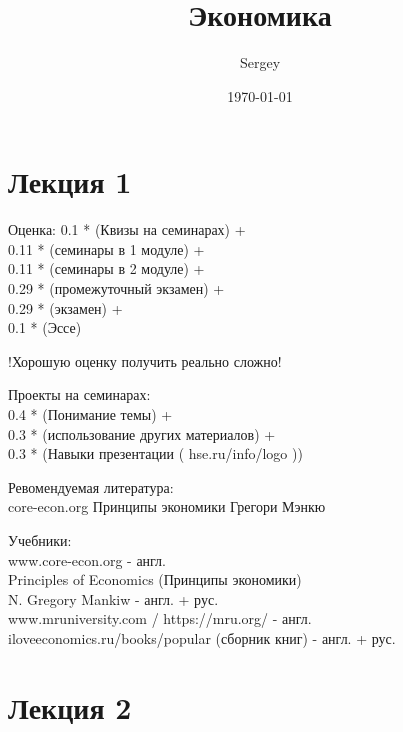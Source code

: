 \documentclass[a4paper]{article}
\author{Sergey}
\title{Экономика}
\date{\today}
\begin{document}
\maketitle

\newpage

\section{Лекция 1}

Оценка: 
0.1 * (Квизы на семинарах) + \\0.11 * (семинары в 1 модуле) + \\0.11 * (семинары в 2 модуле) +  \\0.29 * (промежуточный экзамен) + \\0.29 * (экзамен) + \\0.1 * (Эссе)


!Хорошую оценку получить реально сложно!



Проекты на семинарах: \\0.4 * (Понимание темы) + \\0.3 * (использование других материалов) + \\0.3 * (Навыки презентации ( hse.ru/info/logo ))


Ревомендуемая литература:\\
core-econ.org
Принципы экономики Грегори Мэнкю

Учебники:\\
www.core-econ.org - англ.\\
Principles of Economics (Принципы экономики)\\ N. Gregory Mankiw - англ. + рус.\\


www.mruniversity.com / https://mru.org/
 - англ.\\
 
 
iloveeconomics.ru/books/popular (сборник книг) - англ. + рус.
\newpage

\section{Лекция 2}
\end{document}
